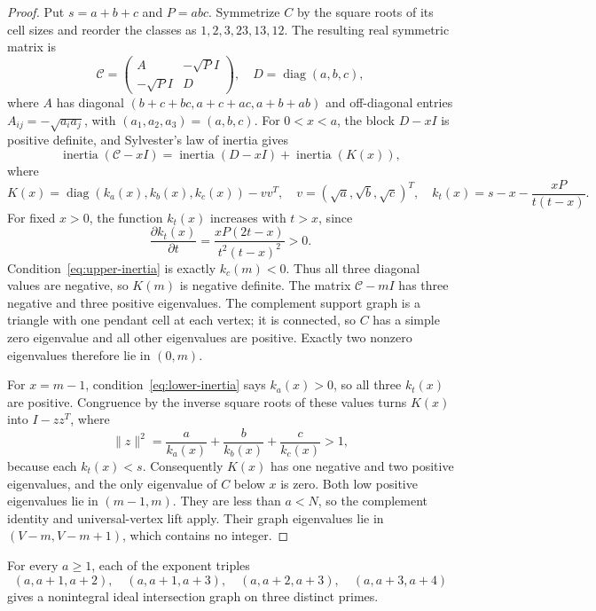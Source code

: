 \begin{proof}
Put $s=a+b+c$ and $P=abc$. Symmetrize $C$ by the square roots of its
cell sizes and reorder the classes as $1,2,3,23,13,12$. The resulting
real symmetric matrix is
\[
\mathcal C=\begin{pmatrix}A&-\sqrt P I\\-\sqrt P I&D\end{pmatrix},
\quad D=\operatorname{diag}(a,b,c),
\]
where $A$ has diagonal $(b+c+bc,a+c+ac,a+b+ab)$ and
off-diagonal entries $A_{ij}=-\sqrt{a_i a_j}$, with
$(a_1,a_2,a_3)=(a,b,c)$. For $0<x<a$, the block $D-xI$ is positive
definite, and Sylvester's law of inertia gives
\[
\operatorname{inertia}(\mathcal C-xI)
=\operatorname{inertia}(D-xI)+\operatorname{inertia}(K(x)),
\]
where
\[
K(x)=\operatorname{diag}(k_a(x),k_b(x),k_c(x))-vv^T,
\quad v=(\sqrt a,\sqrt b,\sqrt c)^T,
\quad k_t(x)=s-x-\frac{xP}{t(t-x)}.
\]
For fixed $x>0$, the function $k_t(x)$ increases with $t>x$, since
\[
\frac{\partial k_t(x)}{\partial t}
=\frac{xP(2t-x)}{t^2(t-x)^2}>0.
\]
Condition~\eqref{eq:upper-inertia} is exactly $k_c(m)<0$.
Thus all three diagonal values are negative, so $K(m)$ is negative
definite. The matrix $\mathcal C-mI$ has three negative and three
positive eigenvalues. The complement support graph is a triangle with
one pendant cell at each vertex; it is connected, so $C$ has a simple
zero eigenvalue and all other eigenvalues are positive. Exactly two
nonzero eigenvalues therefore lie in $(0,m)$.

For $x=m-1$, condition~\eqref{eq:lower-inertia} says $k_a(x)>0$,
so all three $k_t(x)$ are positive. Congruence by the inverse square
roots of these values turns $K(x)$ into $I-zz^T$, where
\[
\|z\|^2=\frac{a}{k_a(x)}+\frac{b}{k_b(x)}+\frac{c}{k_c(x)}>1,
\]
because each $k_t(x)<s$. Consequently $K(x)$ has one negative and two
positive eigenvalues, and the only eigenvalue of $C$ below $x$ is zero.
Both low positive eigenvalues lie in $(m-1,m)$. They are less than
$a<N$, so the complement identity and universal-vertex lift apply.
Their graph eigenvalues lie in $(V-m,V-m+1)$, which contains no integer.
\end{proof}

\begin{theorem}
\label{thm:bounded-gaps}
For every $a\geq1$, each of the exponent triples
\[
(a,a+1,a+2),\quad(a,a+1,a+3),\quad
(a,a+2,a+3),\quad(a,a+3,a+4)
\]
gives a nonintegral ideal intersection graph on three distinct primes.
\end{theorem}

